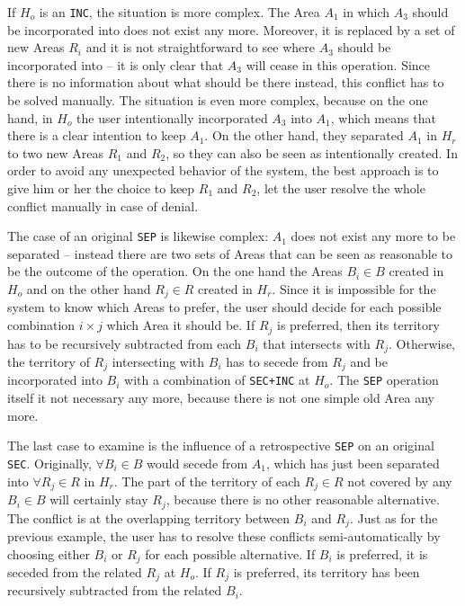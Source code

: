 If $H_o$ is an \texttt{INC}, the situation is more complex. The Area $A_1$ in which $A_3$ should be incorporated into does not exist any more. Moreover, it is replaced by a set of new Areas $R_i$ and it is not straightforward to see where $A_3$ should be incorporated into -- it is only clear that $A_3$ will cease in this operation. Since there is no information about what should be there instead, this conflict has to be solved manually. The situation is even more complex, because on the one hand, in $H_o$ the user intentionally incorporated $A_3$ into $A_1$, which means that there is a clear intention to keep $A_1$. On the other hand, they separated $A_1$ in $H_r$ to two new Areas $R_1$ and $R_2$, so they can also be seen as intentionally created. In order to avoid any unexpected behavior of the system, the best approach is to give him or her the choice to keep $R_1$ and $R_2$, let the user resolve the whole conflict manually in case of denial.

The case of an original \texttt{SEP} is likewise complex: $A_1$ does not exist any more to be separated -- instead there are two sets of Areas that can be seen as reasonable to be the outcome of the operation. On the one hand the Areas $B_i \in B$ created in $H_o$ and on the other hand $R_j \in R$ created in $H_r$. Since it is impossible for the system to know which Areas to prefer, the user should decide for each possible combination $i \times j$ which Area it should be. If $R_j$ is preferred, then its territory has to be recursively subtracted from each $B_i$ that intersects with $R_j$. Otherwise, the territory of $R_j$ intersecting with $B_i$ has to secede from $R_j$ and be incorporated into $B_i$ with a combination of \texttt{SEC+INC} at $H_o$. The \texttt{SEP} operation itself it not necessary any more, because there is not one simple old Area any more.

The last case to examine is the influence of a retrospective \texttt{SEP} on an original \texttt{SEC}. Originally, $\forall B_i \in B$ would secede from $A_1$, which has just been separated into $\forall R_j \in R$ in $H_r$. The part of the territory of each $R_j \in R$ not covered by any $B_i \in B$ will certainly stay $R_j$, because there is no other reasonable alternative. The conflict is at the overlapping territory between $B_i$ and $R_j$. Just as for the previous example, the user has to resolve these conflicts semi-automatically by choosing either $B_i$ or $R_j$ for each possible alternative. If $B_i$ is preferred, it is seceded from the related $R_j$ at $H_o$. If $R_j$ is preferred, its territory has been recursively subtracted from the related $B_i$.

